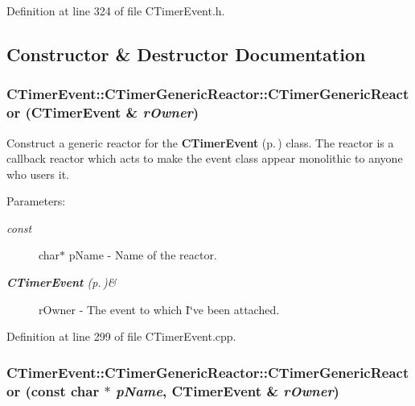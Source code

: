 Definition at line 324 of file CTimer\-Event.h.

\subsection{Constructor \& Destructor Documentation}
\subsubsection{\setlength{\rightskip}{0pt plus 5cm}CTimer\-Event::CTimer\-Generic\-Reactor::CTimer\-Generic\-Reactor ({\bf CTimer\-Event} \& {\em r\-Owner})}\label{classCTimerEvent_1_1CTimerGenericReactor_a0}


Construct a generic reactor for the {\bf CTimer\-Event} {\rm (p.\,\pageref{classCTimerEvent})} class. The reactor is a callback reactor which acts to make the event class appear monolithic to anyone who users it.\begin{Desc}
\item[Parameters: ]\par
\begin{description}
\item[{\em 
const}]char$\ast$ p\-Name - Name of the reactor. \item[{\em 
{\bf CTimer\-Event} {\rm (p.\,\pageref{classCTimerEvent})}\&}]r\-Owner - The event to which I\char`\"{}ve been attached. \end{description}
\end{Desc}


Definition at line 299 of file CTimer\-Event.cpp.
\subsubsection{\setlength{\rightskip}{0pt plus 5cm}CTimer\-Event::CTimer\-Generic\-Reactor::CTimer\-Generic\-Reactor (const char $\ast$ {\em p\-Name}, {\bf CTimer\-Event} \& {\em r\-Owner})}\label{classCTimerEvent_1_1CTimerGenericReactor_a1}




